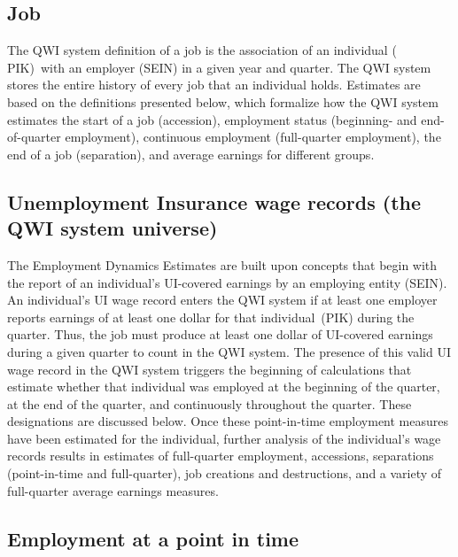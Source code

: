 \subsection{Job}

The QWI system definition of a job is the association of an individual (%
PIK)\ with an employer (SEIN) in a given year and
quarter.  The QWI system stores the entire history of every job that an
individual holds. Estimates are based on the definitions presented below,
which formalize how the QWI system estimates the start of a job
(accession), employment status (beginning- and end-of-quarter employment),
continuous employment (full-quarter employment), the end of a job
(separation), and average earnings for different groups.

\subsection{Unemployment Insurance wage records (the QWI system universe)}

The Employment Dynamics Estimates are built upon concepts that begin with
the report of an individual's UI-covered earnings by an employing
entity (SEIN). An individual's {UI} wage record enters the
QWI system if at least one employer reports earnings of at least one dollar
for that individual\ (PIK) during the quarter. Thus, the job must
produce at least one dollar of {UI}-covered earnings during a given
quarter to count in the QWI system. The presence of this valid {UI}
wage record in the QWI system triggers the beginning of calculations that
estimate whether that individual was employed at the beginning of the
quarter, at the end of the quarter, and continuously throughout the quarter.
These designations are discussed below. Once these point-in-time employment
measures have been estimated for the individual, further analysis of the
individual's wage records results in estimates of full-quarter employment,
accessions, separations (point-in-time and full-quarter), job creations and
destructions, and a variety of full-quarter average earnings measures.

\subsection{Employment at a point in time}


